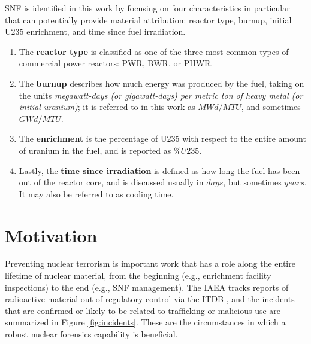 \gls{SNF} is identified in this work by focusing on four characteristics in
particular that can potentially provide material attribution: reactor type,
burnup, initial \gls{U235} enrichment, and time since fuel irradiation. 
\begin{enumerate}
  \item The \textbf{reactor type} is classified as one of the three most common
        types of commercial power reactors: \gls{PWR}, \gls{BWR}, or \gls{PHWR}.
  \item The \textbf{burnup} describes how much energy was produced by the fuel,
        taking on the units \textit{megawatt-days (or gigawatt-days) per metric 
        ton of heavy metal (or initial uranium)}; it is referred to in this work 
        as $MWd/MTU$, and sometimes $GWd/MTU$.  
  \item The \textbf{enrichment} is the percentage of \gls{U235} with respect to
        the entire amount of uranium in the fuel, and is reported as $\%U235$. 
  \item Lastly, the \textbf{time since irradiation} is defined as how long the
        fuel has been out of the reactor core, and is discussed usually in $days$,
        but sometimes $years$. It may also be referred to as cooling time. 
\end{enumerate}

\section{Motivation}
\label{sec:motivation}

Preventing nuclear terrorism is important work that has a role along the entire
lifetime of nuclear material, from the beginning (e.g., enrichment facility
inspections) to the end (e.g., \gls{SNF} management). The \gls{IAEA} tracks
reports of radioactive material out of regulatory control via the \gls{ITDB}
\cite{itdb}, and the incidents that are confirmed or likely to be related to
trafficking or malicious use are summarized in Figure \ref{fig:incidents}.
These are the circumstances in which a robust nuclear forensics capability is
beneficial.

